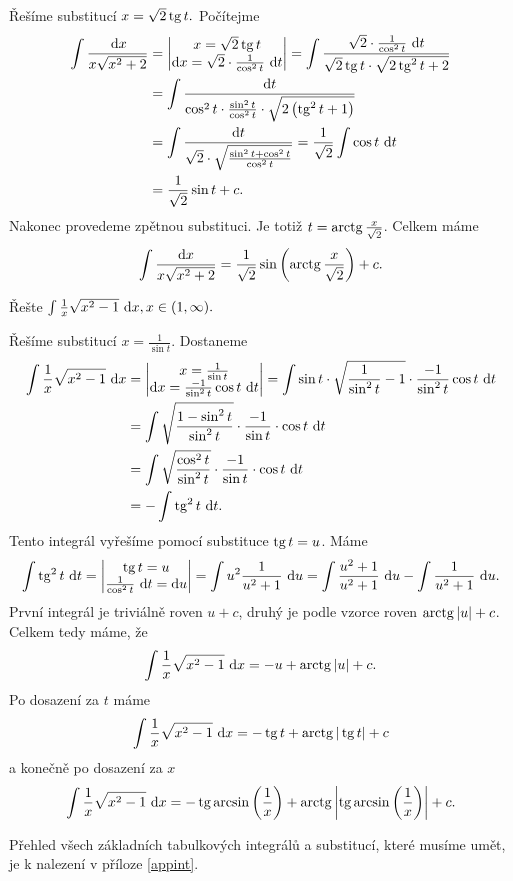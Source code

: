 \begin{reseni}
Řešíme substitucí $x=\sqrt{2}\operatorname{tg} t. $ Počítejme
\begin{align*}\int \frac{\, \mathop{}\!\mathrm{d} x}{x \sqrt{x^2+2} } &= \begin{vmatrix}
	x = \sqrt{2}\operatorname{tg} t \\
	\mathop{}\!\mathrm{d} x = \sqrt{2}\cdot \frac{1}{\cos^2 t} \, \mathop{}\!\mathrm{d} t
\end{vmatrix} = \int \frac{\sqrt{2}\cdot \frac{1}{\cos^2 t} \, \mathop{}\!\mathrm{d} t}{\sqrt{2} \operatorname{tg} t \cdot \sqrt{2 \operatorname{tg}^2 t + 2}} \\
&= \int \frac{\mathop{}\!\mathrm{d} t }{\cos^2 t \cdot \frac{\sin^2 t }{\cos^2 t } \cdot \sqrt{2 \left( \operatorname{tg} ^2 t +1 \right ) }}\\
&= \int \frac{\mathop{}\!\mathrm{d} t }{\sqrt{2}  \cdot \sqrt{\frac{\sin^2 t + \cos ^2 t }{\cos^2 t }}} = \frac{1}{\sqrt{2}} \int \cos t \, \mathop{}\!\mathrm{d} t \\
&= \frac{1 }{\sqrt{2}} \sin t + c.
\end{align*}
Nakonec provedeme zpětnou substituci. Je totiž $t=\operatorname{arctg} \frac{x }{\sqrt{2}}$. Celkem máme
$$
    \int \frac{\mathop{}\!\mathrm{d} x}{x \sqrt{x^2+2} } = \frac{1}{\sqrt{2}} \sin \left( \operatorname{arctg} \frac{x }{\sqrt{2}} \right ) +c.
$$
\end{reseni}

\begin{priklad}
Řešte $\int \frac{1}{x}\sqrt{x^2-1}\, \mathop{}\!\mathrm{d} x, x \in (1,\infty). $
\end{priklad}

\begin{reseni}
Řešíme substitucí $x=\frac{1}{\sin t}.$ Dostaneme
\begin{align*}
\int \frac{1}{x}\sqrt{x^2-1}\, \mathop{}\!\mathrm{d} x &= \begin{vmatrix}
	x = \frac{1}{\sin t} \\
	\mathop{}\!\mathrm{d} x = \frac{-1}{\sin^2 t}\cos t \, \mathop{}\!\mathrm{d} t
\end{vmatrix} = \int \sin t \cdot \sqrt{\frac{1}{\sin^2 t } - 1} \cdot \frac{-1 }{\sin^2 t} \cos t \, \mathop{}\!\mathrm{d} t\\
&= \int \sqrt{\frac{1-\sin^2 t }{\sin^2 t}} \cdot \frac{-1}{\sin t} \cdot \cos t \, \mathop{}\!\mathrm{d} t \\
&= \int \sqrt{\frac{\cos^2 t }{\sin^2 t}} \cdot \frac{-1}{\sin t } \cdot \cos t \, \mathop{}\!\mathrm{d} t \\
&= -\int \operatorname{tg}^2 t \, \mathop{}\!\mathrm{d} t.
\end{align*}
Tento integrál vyřešíme pomocí substituce $\operatorname{tg} t = u$. Máme
$$
    \int \operatorname{tg}^2 t \, \mathop{}\!\mathrm{d} t = \begin{vmatrix}
	\operatorname{tg} t = u\\
	\frac{1}{\cos^2 t} \, \mathop{}\!\mathrm{d} t = \mathop{}\!\mathrm{d} u
    \end{vmatrix}=\int u^2 \frac{1}{u^2 + 1} \, \mathop{}\!\mathrm{d} u = \int \frac{u^2 + 1}{u^2 + 1} \, \mathop{}\!\mathrm{d} u - \int \frac{1}{u^2 +1} \, \mathop{}\!\mathrm{d} u.
$$
První integrál je triviálně roven $u+ c$, druhý je podle vzorce roven $\operatorname{arctg} |u|+c$.
Celkem tedy máme, že
$$
    \int \frac{1}{x}\sqrt{x^2-1}\, \mathop{}\!\mathrm{d} x = -u + \operatorname{arctg} |u|+c.
$$
Po dosazení za $t$ máme
$$
    \int \frac{1}{x}\sqrt{x^2-1}\, \mathop{}\!\mathrm{d} x = -\operatorname{tg} t + \operatorname{arctg} |\operatorname{tg} t|+c
$$
a konečně po dosazení za $x$
$$
    \int \frac{1}{x}\sqrt{x^2-1}\, \mathop{}\!\mathrm{d} x = -\operatorname{tg} \arcsin \left( \frac{1}{x} \right )  + \operatorname{arctg} \left |\operatorname{tg} \arcsin\left( \frac{1}{x} \right ) \right|+c.
$$
\end{reseni}

\begin{pozn}
    Přehled všech základních tabulkových integrálů a substitucí, které musíme umět, je
    k nalezení v příloze \ref{appint}.
\end{pozn}
